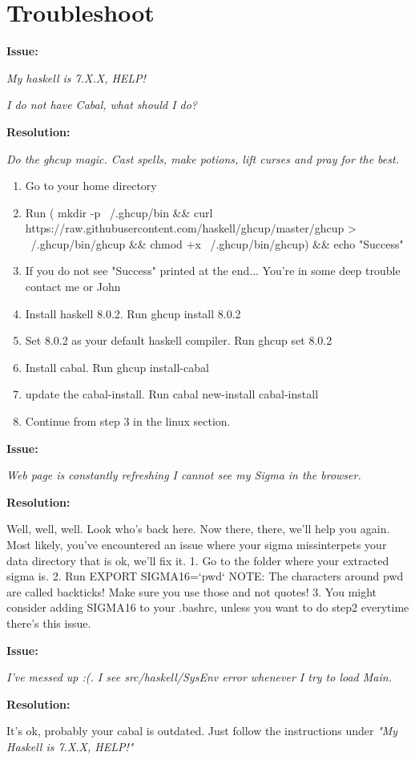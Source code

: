 \documentclass{article}
\begin{document}
\section{Troubleshoot}

 \textbf{Issue:}
 
\textit{ My haskell is 7.X.X, HELP!}
 
\textit{ I do not have Cabal, what should I do?}

\textbf{Resolution:}
 
        \textit{Do the ghcup magic. Cast spells, make potions, lift curses and pray for the best.}
        
        \begin{enumerate}
             
        \item Go to your home directory
        \item Run ( mkdir -p ~/.ghcup/bin \&\& curl https://raw.githubusercontent.com/haskell/ghcup/master/ghcup > ~/.ghcup/bin/ghcup \&\& chmod +x ~/.ghcup/bin/ghcup) \&\& echo "Success"
        \item If you do not see "Success" printed at the end... You're in some deep trouble contact me or John
        \item Install haskell 8.0.2. Run ghcup install 8.0.2
        \item Set 8.0.2 as your default haskell compiler. Run ghcup set 8.0.2
        \item Install cabal. Run ghcup install-cabal
        \item update the cabal-install. Run cabal new-install cabal-install
        \item Continue from step 3 in the linux section.
        \end{enumerate}

 \textbf{Issue:}
 
 \textit{Web page is constantly refreshing I cannot see my Sigma in the browser.}
 
 \textbf{Resolution:}
 
        Well, well, well. Look who's back here. Now there, there, we'll help you again. Most likely, you've encountered an issue where your sigma missinterpets your data directory that is ok, we'll fix it.
        1. Go to the folder where your extracted sigma is.
        2. Run EXPORT SIGMA16=`pwd`
        NOTE: The characters around pwd are called backticks! Make sure you use those and not quotes!
	3. You might consider adding SIGMA16 to your .bashrc, unless you want to do step2 everytime there's this issue.

 \textbf{Issue:} 
 
 \textit{I've messed up :(. I see src/haskell/SysEnv error whenever I try to load Main.}
 
 \textbf{Resolution:}
 
        It's ok, probably your cabal is outdated. Just follow the instructions under \textit{"My Haskell is 7.X.X, HELP!"}
\end{document}
